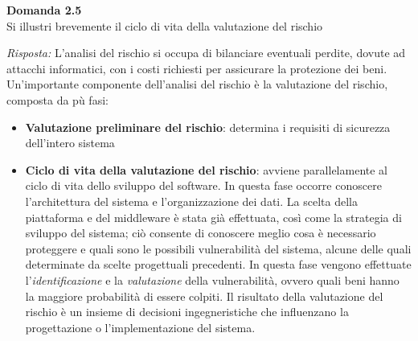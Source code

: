 \documentclass{article}
\newenvironment{problem}[2][Domanda]
    { \begin{mdframed}[backgroundcolor=gray!20] \textbf{#1 #2} \\}
    {  \end{mdframed}}
\newenvironment{solution}
    {\textit{Risposta:}}
    {}
\begin{document}
\begin{problem}{2.5}
Si illustri brevemente il ciclo di vita della valutazione del rischio
\end{problem}
\begin{solution}
L'analisi del rischio si occupa di bilanciare eventuali perdite, dovute ad attacchi informatici, con i costi richiesti per assicurare la protezione dei beni.
\newline
Un'importante componente dell'analisi del rischio è la valutazione del rischio, composta da pù fasi:
\begin{itemize}
	\item \textbf{Valutazione preliminare del rischio}: determina i requisiti di sicurezza dell'intero sistema
	\item \textbf{Ciclo di vita della valutazione del rischio}: avviene parallelamente al ciclo di vita dello sviluppo del software.
	\newline
	In questa fase occorre conoscere l'architettura del sistema e l'organizzazione dei dati.
	\newline
	La scelta della piattaforma e del middleware è stata già effettuata, così come la strategia di sviluppo del sistema; ciò consente di conoscere meglio cosa è necessario proteggere e quali sono le possibili vulnerabilità del sistema, alcune delle quali determinate da scelte progettuali precedenti.
	\newline
	In questa fase vengono effettuate l'\textit{identificazione} e la \textit{valutazione} della vulnerabilità, ovvero quali beni hanno la maggiore probabilità di essere colpiti.
	\newline
	Il risultato della valutazione del rischio è un insieme di decisioni ingegneristiche che influenzano la progettazione o l'implementazione del sistema.
\end{itemize}
\end{solution}
\end{document}
